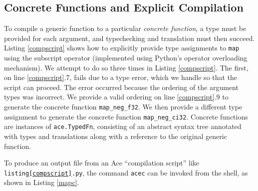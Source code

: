 \documentclass[10pt,preprint]{sigplanconf}
\begin{document}
{\subsection{Concrete Functions and Explicit Compilation}
To compile a generic function to a particular \emph{concrete function}, a type must be provided for each argument, and typechecking and translation must then succeed. Listing \ref{compscript} shows how to explicitly provide type assignments to \verb|map| using the subscript operator (implemented using Python's operator overloading mechanism). We attempt to do so three times in Listing \ref{compscript}. The first, on line \ref{compscript}.7, fails due to a type error, which we handle so that the script can proceed. The error occurred  because the ordering of the argument types was incorrect. We provide a valid ordering on line \ref{compscript}.9 to generate the concrete function \verb|map_neg_f32|. We then provide a different type assignment to generate the concrete function \verb|map_neg_ci32|.
Concrete functions are instances of \verb|ace.TypedFn|, consisting of an abstract syntax tree annotated with types and translations along with a reference to the original generic function. %

To produce an output file from an Ace ``compilation script'' like \verb|listing|\texttt{\ref{compscript}}\verb|.py|, the command \verb|acec| can be invoked from the shell, as shown in Listing \ref{mapc}. 
}
\end{document}
